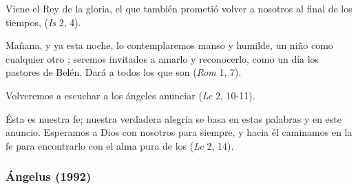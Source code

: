 \begin{body}
					Viene el Rey de la gloria, el que también prometió volver a nosotros al final de los tiempos,  (\emph{Is} 2, 4).
					
					Mañana, y ya esta noche, lo contemplaremos manso y humilde, un niño como cualquier otro ; seremos invitados a amarlo y reconocerlo, como un día los pastores de Belén. Dará  a todos los que son  (\emph{Rom} 1, 7).
					
					Volveremos a escuchar a los ángeles anunciar  (\emph{Lc} 2, 10-11).
					
					Ésta es nuestra fe; nuestra verdadera alegría se basa en estas palabras y en este anuncio. Esperamos a Dios con nosotros para siempre, y hacia él caminamos en la fe para encontrarlo con el alma pura de los  (\emph{Lc} 2, 14).
				\end{body}

			\subsubsection{Ángelus (1992)}
				
